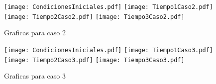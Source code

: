 \documentclass{article}
\begin{document}
\begin{figure}[h!]
\centering
\texttt{[image: CondicionesIniciales.pdf]}
\texttt{[image: Tiempo1Caso2.pdf]}
\texttt{[image: Tiempo2Caso2.pdf]}
\texttt{[image: Tiempo3Caso2.pdf]}
\caption{Graficas para caso 2}
\label{fig:GrafPDE2}

\end{figure}

\begin{figure}[h!]
\centering
\texttt{[image: CondicionesIniciales.pdf]}
\texttt{[image: Tiempo1Caso3.pdf]}
\texttt{[image: Tiempo2Caso3.pdf]}
\texttt{[image: Tiempo3Caso3.pdf]}
\caption{Graficas para caso 3}
\label{fig:GrafPDE3}


\end{figure}
\end{document}
